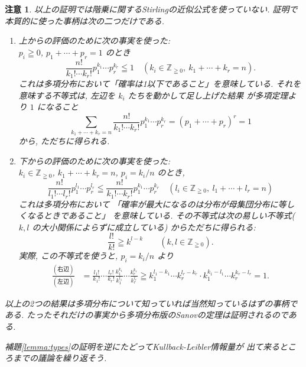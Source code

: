 \documentclass[12pt,twoside]{jarticle}
\newcommand\Z{{\mathbb Z}} %
\theoremstyle{jplain}
\theoremstyle{jplain}
\theoremstyle{jplain}
\newtheorem{remark}[theorem]{注意}
\numberwithin{theorem}{section}
\numberwithin{equation}{section}
\numberwithin{figure}{section}
\numberwithin{table}{section}
\newcommand\lemmaref[1]{補題\ref{#1}}
\begin{document}
\begin{remark}
以上の証明では階乗に関するStirlingの近似公式を使っていない.
証明で本質的に使った事柄は次の二つだけである.
\begin{enumerate}
\item[(1)] 上からの評価のために次の事実を使った: \\
$p_i\geqq 0$, $p_1+\cdots+p_r=1$ のとき
\[
\frac{n!}{k_1!\cdots k_r!}p_1^{k_1}\cdots p_r^{k_r}\leqq 1
\quad
(k_i\in\Z_{\geqq 0},\ k_1+\cdots+k_r=n).
\]
これは多項分布において「確率は1以下であること」を意味している.
それを意味する不等式は, 左辺を $k_i$ たちを動かして足し上げた結果
が多項定理より $1$ になること
\[
\sum_{k_1+\cdots+k_r=n}
\frac{n!}{k_1!\cdots k_r!}p_1^{k_1}\cdots p_r^{k_r}
= (p_1+\cdots+p_r)^r
= 1
\]
から, ただちに得られる.

\item[(2)] 下からの評価のために次の事実を使った: \\
$k_i\in\Z_{\geqq 0}$, $k_1+\cdots+k_r=n$, $p_i=k_i/n$ のとき,
\[
\frac{n!}{l_1!\cdots l_r!}p_1^{l_1}\cdots p_r^{l_r}
\leqq
\frac{n!}{k_1!\cdots k_r!}p_1^{k_1}\cdots p_r^{k_r}
\quad
(l_i\in\Z_{\geqq 0},\ l_1+\cdots+l_r=n)
\]
これは多項分布において
「確率が最大になるのは分布が母集団分布に等しくなるときであること」
を意味している.
その不等式は次の易しい不等式($k,l$ の大小関係によらずに成立している)
からただちに得られる:
\[
\frac{l!}{k!}\geqq k^{l-k}
\qquad (k,l\in\Z_{\geqq 0}).
\]
実際, この不等式を使うと, $p_i=k_i/n$ より
\begin{align*}
\frac{(\text{右辺})}{(\text{左辺})}
&
=
\frac{l_1!}{k_1!}\cdots\frac{l_r!}{k_r!}
\frac{k_1^{k_1}}{k_1^{l_1}}\cdots\frac{k_r^{k_r}}{k_r^{l_r}}
\geqq k_1^{l_1-k_1}\cdots k_r^{l_r-k_r}\cdot k_1^{k_1-l_1}\cdots k_r^{k_r-l_r}
=1.
\end{align*}
\end{enumerate}
以上の2つの結果は多項分布について知っていれば当然知っているはずの事柄である.
たったそれだけの事実から多項分布版のSanovの定理は証明されるのである.

\lemmaref{lemma:types}の証明を逆にたどってKullback-Leibler情報量が
出て来るところまでの議論を繰り返そう.


\end{remark}
\end{document}
